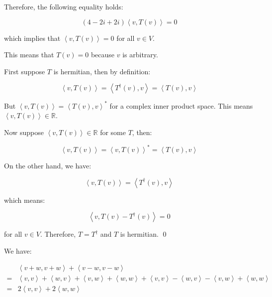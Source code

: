 \documentclass[12pt]{article}
\begin{document}
Therefore, the following equality holds:

\begin{equation}
    (4 - 2i + 2i) \left\langle v, T(v) \right\rangle = 0
\end{equation}

which implies that $\left\langle v, T(v) \right\rangle = 0$ for all $v \in V$.

This means that $T(v) = 0$ because $v$ is arbitrary.

First suppose $T$ is hermitian, then by definition:

\begin{equation}
    \left\langle v, T(v) \right\rangle = \left\langle T^{\dagger}(v), v \right\rangle = \left\langle T(v), v \right\rangle
\end{equation}

But $\left\langle v, T(v) \right\rangle = \left\langle T(v), v \right\rangle^{*}$ for a complex inner product space. This means $\left\langle v, T(v) \right\rangle \in \mathbb{R}$.

Now suppose $\left\langle v, T(v) \right\rangle \in \mathbb{R}$ for some $T$, then:

\begin{equation}
    \left\langle v, T(v) \right\rangle = \left\langle v, T(v) \right\rangle^{*} = \left\langle T(v), v \right\rangle
\end{equation}

On the other hand, we have:

\begin{equation}
    \left\langle v, T(v) \right\rangle = \left\langle T^{\dagger}(v), v \right\rangle
\end{equation}

which means:

\begin{equation}
    \left\langle v, T(v) - T^{\dagger}(v) \right\rangle = 0
\end{equation}

for all $v \in V$. Therefore, $T = T^{\dagger}$ and $T$ is hermitian.
\qed



We have:

\begin{equation}
\begin{split}
    &\left\langle v + w, v + w \right\rangle + \left\langle v - w, v - w \right\rangle \\
    =& \left\langle v, v \right\rangle + \left\langle w, v \right\rangle + \left\langle v, w \right\rangle + \left\langle w, w \right\rangle + \left\langle v, v \right\rangle - \left\langle w, v \right\rangle - \left\langle v, w \right\rangle + \left\langle w, w \right\rangle \\
    =& 2 \left\langle v, v \right\rangle + 2 \left\langle w, w \right\rangle
\end{split}
\end{equation}
\end{document}
